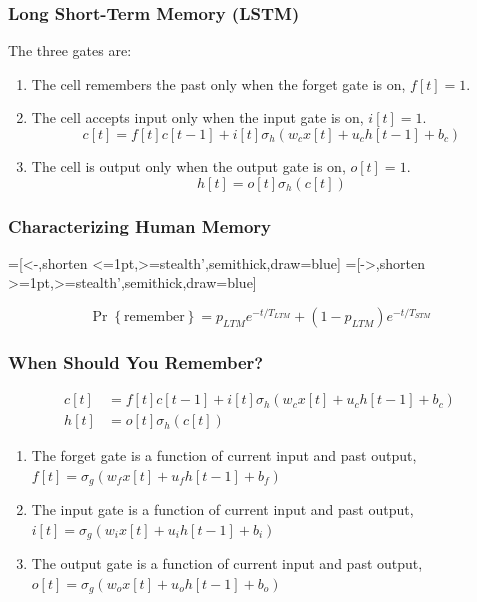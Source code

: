 \documentclass{beamer}
\begin{document}
\begin{frame}
  \frametitle{Long Short-Term Memory (LSTM)}
  The three gates are:
  \begin{enumerate}
  \item The cell remembers the past only when the forget gate is on, $f[t]=1$.
  \item The cell accepts input only when the input gate is on, $i[t]=1$.
    \[
    c[t] = f[t]c[t-1] + i[t]\sigma_h\left(w_cx[t]+u_ch[t-1]+b_c\right)
    \]
  \item The cell is output only when the output gate is on, $o[t]=1$.
    \[
    h[t] = o[t]\sigma_h(c[t])
    \]
  \end{enumerate}
\end{frame}
  
\begin{frame}
  \frametitle{Characterizing Human Memory}
  \begin{center}
    =[<-,shorten <=1pt,>=stealth',semithick,draw=blue]
    =[->,shorten >=1pt,>=stealth',semithick,draw=blue]
  \end{center}
  \[
  \Pr\left\{\mbox{remember}\right\}=p_{LTM} e^{-t/T_{LTM}}+ (1-p_{LTM})e^{-t/T_{STM}}
  \]
\end{frame}

\begin{frame}
  \frametitle{When Should You Remember?}
  \begin{align*}
    c[t] &= f[t]c[t-1] + i[t]\sigma_h\left(w_cx[t]+u_ch[t-1]+b_c\right)\\
    h[t] &= o[t]\sigma_h(c[t])
  \end{align*}
  \begin{enumerate}
  \item The forget gate is a function of current input and past output,
    $f[t] = \sigma_g\left(w_fx[t]+u_fh[t-1]+b_f\right)$
  \item The input gate is a function of current input and past output,
    $i[t] = \sigma_g\left(w_ix[t]+u_ih[t-1]+b_i\right)$
  \item The output gate is a function of current input and past output,
    $o[t] = \sigma_g\left(w_ox[t]+u_oh[t-1]+b_o\right)$
  \end{enumerate}
\end{frame}
  
\end{document}
